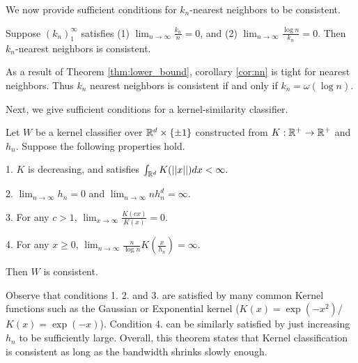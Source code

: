 We now provide sufficient conditions for $k_n$-nearest neighbors to be  \ncons\emph{ }consistent.

\begin{cor}\label{cor:nn}
Suppose $(k_n)_1^{\infty}$ satisfies (1) $\lim_{n \to \infty} \frac{k_n}{n} = 0$, and (2) $\lim_{n \to \infty} \frac{\log n}{k_n} = 0$. Then $k_n$-nearest neighbors is \ncons\emph{ }consistent.
\end{cor}

As a result of Theorem \ref{thm:lower_bound}, corollary \ref{cor:nn} is tight for nearest neighbors. Thus $k_n$ nearest neighbors is \ncons\emph{ }consistent if and only if $k_n = \omega(\log n)$. 

Next, we give sufficient conditions for a kernel-similarity classifier.
\begin{cor}\label{cor:kern}
Let $W$ be a kernel classifier over $\mathbb R^d \times \{\pm 1\}$ constructed from $K: \mathbb R^+ \to \mathbb R^+$ and $h_n$. Suppose the following properties hold.

1. $K$ is decreasing, and satisfies $\int_{\mathbb R^d}K(||x||)dx < \infty.$

2. $\lim_{n \to \infty} h_n = 0$ and $\lim_{n \to \infty} nh_n^d = \infty$.

3. For any $c > 1$, $\lim_{x \to \infty} \frac{K(cx)}{K(x)} = 0$.

4. For any $x \geq 0$, $\lim_{n \to \infty} \frac{n}{\log n}K(\frac{x}{h_n}) = \infty$.

Then $W$ is \ncons\emph{ }consistent.
\end{cor}

Observe that conditions 1. 2. and 3. are satisfied by many common Kernel functions such as the Gaussian or Exponential kernel ($K(x) = \exp(-x^2)$/ $K(x) = \exp(-x)$). Condition 4. can be similarly satisfied by just increasing $h_n$ to be sufficiently large. Overall, this theorem states that Kernel classification is \ncons\emph{ }consistent as long as the bandwidth shrinks slowly enough.

